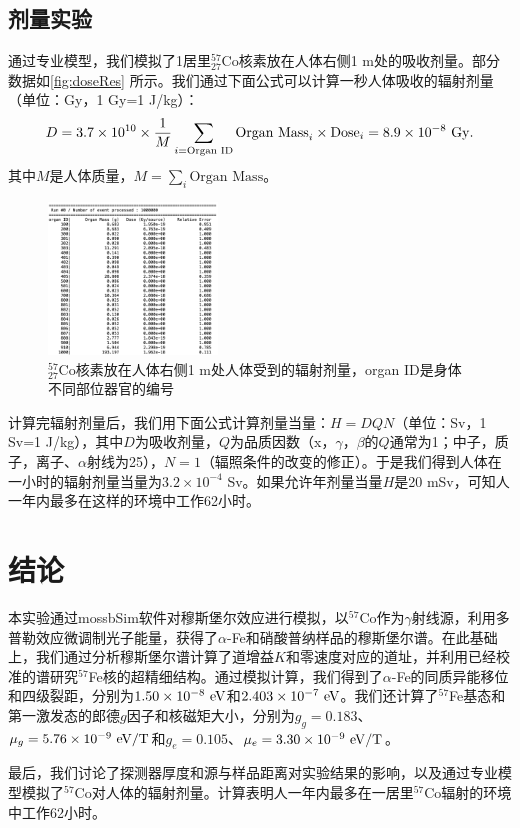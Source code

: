\documentclass[font=default]{mpltx}
\begin{document}
\subsection{剂量实验}
通过专业模型，我们模拟了1居里$_{27}^{57}$Co核素放在人体右侧1 m处的吸收剂量。部分数据如\autoref{fig:doseRes} 所示。我们通过下面公式可以计算一秒人体吸收的辐射剂量（单位：Gy，1 Gy=1 J/kg）：
$$D=3.7\times10^{10}\times\frac{1}{M}\sum_{i=\text{Organ ID}}\text{Organ Mass}_i\times\text{Dose}_i=8.9\times10^{-8}\ {\rm Gy}.$$其中$M$是人体质量，$M=\sum_{i}\text{Organ Mass}$。
\begin{figure}[h]
  \centering
  \includegraphics[width=0.4\textwidth]{fig/doseRes.png}
  \caption{$_{27}^{57}$Co核素放在人体右侧1 m处人体受到的辐射剂量，organ ID是身体不同部位器官的编号}
  \label{fig:doseRes}
\end{figure}

计算完辐射剂量后，我们用下面公式计算剂量当量：$H=DQN$（单位：Sv，1 Sv=1 J/kg），其中$D$为吸收剂量，$Q$为品质因数（x，$\gamma$，$\beta$的$Q$通常为1；中子，质子，离子、$\alpha$射线为25），$N=1$（辐照条件的改变的修正）。于是我们得到人体在一小时的辐射剂量当量为$3.2\times10^{-4}$ Sv。如果允许年剂量当量$H$是20 mSv，可知人一年内最多在这样的环境中工作62小时。

\section{结论}
本实验通过mossbSim软件对穆斯堡尔效应进行模拟，以$^{57}$Co作为$\gamma$射线源，利用多普勒效应微调制光子能量，获得了$\alpha$-Fe和硝酸普纳样品的穆斯堡尔谱。在此基础上，我们通过分析穆斯堡尔谱计算了道增益$K$和零速度对应的道址，并利用已经校准的谱研究$^{57}$Fe核的超精细结构。通过模拟计算，我们得到了$\alpha$-Fe的同质异能移位和四级裂距，分别为$1.50\times10^{-8}\ {\rm eV}$和$2.403\times10^{-7}\ {\rm eV}$。我们还计算了$^{57}$Fe基态和第一激发态的郎德$g$因子和核磁矩大小，分别为$g_g=0.183$、$\mu_g=5.76\times10^{-9}\ {\rm eV/T}$和$g_e=0.105$、$\mu_e=3.30\times10^{-9}\ {\rm eV/T}$。

最后，我们讨论了探测器厚度和源与样品距离对实验结果的影响，以及通过专业模型模拟了$^{57}$Co对人体的辐射剂量。计算表明人一年内最多在一居里$^{57}$Co辐射的环境中工作62小时。
\end{document}
